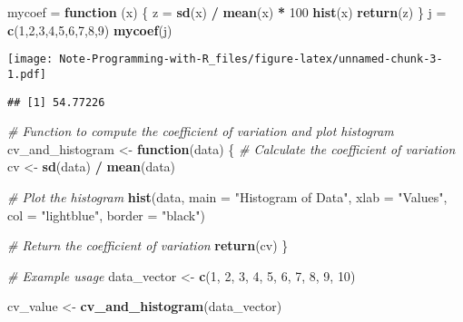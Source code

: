\documentclass[
]{article}
\newenvironment{Shaded}{\begin{snugshade}}{\end{snugshade}}
\newcommand{\AttributeTok}[1]{\textcolor[rgb]{0.13,0.29,0.53}{#1}}
\newcommand{\CommentTok}[1]{\textcolor[rgb]{0.56,0.35,0.01}{\textit{#1}}}
\newcommand{\ControlFlowTok}[1]{\textcolor[rgb]{0.13,0.29,0.53}{\textbf{#1}}}
\newcommand{\DecValTok}[1]{\textcolor[rgb]{0.00,0.00,0.81}{#1}}
\newcommand{\FunctionTok}[1]{\textcolor[rgb]{0.13,0.29,0.53}{\textbf{#1}}}
\newcommand{\NormalTok}[1]{#1}
\newcommand{\OtherTok}[1]{\textcolor[rgb]{0.56,0.35,0.01}{#1}}
\newcommand{\SpecialCharTok}[1]{\textcolor[rgb]{0.81,0.36,0.00}{\textbf{#1}}}
\newcommand{\StringTok}[1]{\textcolor[rgb]{0.31,0.60,0.02}{#1}}
\begin{document}
\begin{Shaded}
\begin{Highlighting}[]
\NormalTok{mycoef }\OtherTok{=} \ControlFlowTok{function}\NormalTok{ (x) \{}
\NormalTok{  z }\OtherTok{=} \FunctionTok{sd}\NormalTok{(x) }\SpecialCharTok{/} \FunctionTok{mean}\NormalTok{(x) }\SpecialCharTok{*} \DecValTok{100}
  \FunctionTok{hist}\NormalTok{(x)}
  \FunctionTok{return}\NormalTok{(z)}
\NormalTok{\}}
\NormalTok{j }\OtherTok{=} \FunctionTok{c}\NormalTok{(}\DecValTok{1}\NormalTok{,}\DecValTok{2}\NormalTok{,}\DecValTok{3}\NormalTok{,}\DecValTok{4}\NormalTok{,}\DecValTok{5}\NormalTok{,}\DecValTok{6}\NormalTok{,}\DecValTok{7}\NormalTok{,}\DecValTok{8}\NormalTok{,}\DecValTok{9}\NormalTok{)}
\FunctionTok{mycoef}\NormalTok{(j)}
\end{Highlighting}
\end{Shaded}

\texttt{[image: Note-Programming-with-R\_files/figure-latex/unnamed-chunk-3-1.pdf]}

\begin{verbatim}
## [1] 54.77226
\end{verbatim}

\begin{Shaded}
\begin{Highlighting}[]
\CommentTok{\# Function to compute the coefficient of variation and plot histogram}
\NormalTok{cv\_and\_histogram }\OtherTok{\textless{}{-}} \ControlFlowTok{function}\NormalTok{(data) \{}
  \CommentTok{\# Calculate the coefficient of variation}
\NormalTok{  cv }\OtherTok{\textless{}{-}} \FunctionTok{sd}\NormalTok{(data) }\SpecialCharTok{/} \FunctionTok{mean}\NormalTok{(data)}
  
  \CommentTok{\# Plot the histogram}
  \FunctionTok{hist}\NormalTok{(data, }\AttributeTok{main =} \StringTok{"Histogram of Data"}\NormalTok{, }\AttributeTok{xlab =} \StringTok{"Values"}\NormalTok{, }\AttributeTok{col =} \StringTok{"lightblue"}\NormalTok{, }\AttributeTok{border =} \StringTok{"black"}\NormalTok{)}
  
  \CommentTok{\# Return the coefficient of variation}
  \FunctionTok{return}\NormalTok{(cv)}
\NormalTok{\}}

\CommentTok{\# Example usage}
\NormalTok{data\_vector }\OtherTok{\textless{}{-}} \FunctionTok{c}\NormalTok{(}\DecValTok{1}\NormalTok{, }\DecValTok{2}\NormalTok{, }\DecValTok{3}\NormalTok{, }\DecValTok{4}\NormalTok{, }\DecValTok{5}\NormalTok{, }\DecValTok{6}\NormalTok{, }\DecValTok{7}\NormalTok{, }\DecValTok{8}\NormalTok{, }\DecValTok{9}\NormalTok{, }\DecValTok{10}\NormalTok{)}

\NormalTok{cv\_value }\OtherTok{\textless{}{-}} \FunctionTok{cv\_and\_histogram}\NormalTok{(data\_vector)}
\end{Highlighting}
\end{Shaded}
\end{document}
